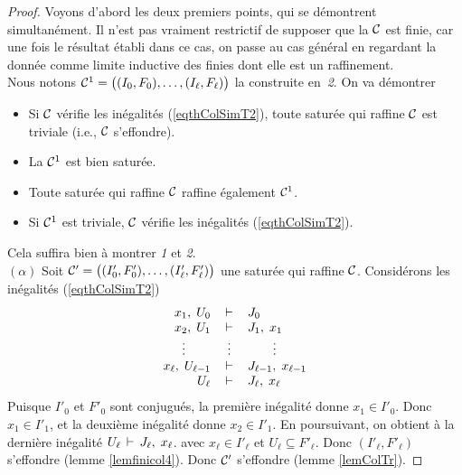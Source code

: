 \begin{proof}
Voyons d'abord les deux premiers points, qui se démontrent simultanément. Il n'est pas vraiment restrictif 
de supposer que la \proc ${\cal C}$ est finie,
car une fois le résultat établi dans ce cas, on passe au cas
général en regardant la \proc donnée comme limite inductive
des \procs finies dont elle est un raffinement.
\\
Nous notons ${\cal C}^1=\big((I_0,F_0),\ldots,(I_\ell,F_\ell)\big)$ la \proc
construite en~\emph{2}.
On va démontrer
\begin{itemize}
\item [$(\alpha)$] Si ${\cal C}$ vérifie les inégalités (\ref{eqthColSimT2}),
toute \proc saturée qui raffine ${\cal C}$ est triviale (i.e., ${\cal C}$
s'effondre).
\item [$(\beta)$]  La \proc ${\cal C}^1$ est bien  saturée.
\item [$(\gamma)$] Toute \proc saturée qui raffine ${\cal C}$ raffine
également ${\cal C}^1$.
\item [$(\delta)$] Si ${\cal C}^1$ est triviale, ${\cal C}$ vérifie les
inégalités (\ref{eqthColSimT2}).
\end{itemize}
Cela suffira bien à montrer \emph{1} et \emph{2}.\\
$(\alpha)$
Soit ${\cal C}'=\big((I'_0,F'_0),\ldots,(I'_\ell,F'_\ell)\big)$ une \proc saturée qui
raffine ${\cal C}$. Considérons les inégalités (\ref{eqthColSimT2})
$$\begin{array}{rcl}
 x_1,\; U_0& \,\vdash\,  & J_0  \\
 x_2,\; U_1& \,\vdash\,  & J_1 ,\; x_1  \\
\vdots\qquad & \vdots  & \qquad\vdots  \\
 x_\ell,\; U_{\ell-1}& \,\vdash\,  & J_{\ell-1} ,\; x_{\ell-1}  \\
 U_\ell& \,\vdash\,  & J_\ell ,\; x_\ell
\end{array}$$
Puisque  $I'_0$ et $F'_0$ sont
conjugués, la première inégalité donne $x_1\in I'_0$.
Donc  $x_1\in I'_1$,
et la deuxième inégalité donne  $x_2\in I'_1$.
En poursuivant, on obtient à la dernière inégalité
$U_\ell \,\vdash\,   J_\ell ,\; x_\ell$. avec $x_\ell\in I'_\ell$ et $U_\ell\subseteq F'_\ell$. Donc $(I'_\ell,F'_\ell)$ s'effondre (lemme \ref{lemfinicol4}). Donc ${\cal C}'$ s'effondre (lemme \ref{lemColTr}).

\end{proof}
